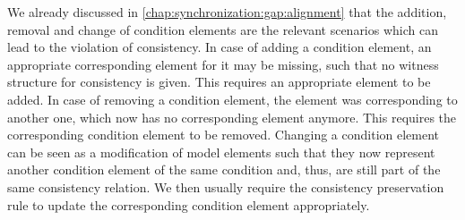 


We already discussed in \autoref{chap:synchronization:gap:alignment} that the addition, removal and change of condition elements are the relevant scenarios which can lead to the violation of consistency.
In case of adding a condition element, an appropriate corresponding element for it may be missing, such that no witness structure for consistency is given.
This requires an appropriate element to be added.
In case of removing a condition element, the element was corresponding to another one, which now has no corresponding element anymore.
This requires the corresponding condition element to be removed.
Changing a condition element can be seen as a modification of model elements such that they now represent another condition element of the same condition and, thus, are still part of the same consistency relation.
We then usually require the consistency preservation rule to update the corresponding condition element appropriately.

